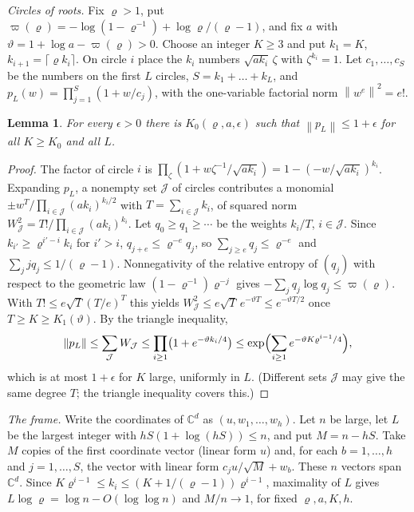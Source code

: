 \documentclass[11pt,a4paper]{article}
\newtheorem{lemma}[theorem]{Lemma}
\theoremstyle{remark}
\newcommand{\norm}[1]{\left\lVert#1\right\rVert}
\newcommand{\C}{\mathbb C}
\begin{document}
\emph{Circles of roots.} Fix $\varrho>1$, put $\varpi(\varrho)=-\log(1-\varrho^{-1})+\log\varrho/(\varrho-1)$, and fix $a$ with $\vartheta=1+\log a-\varpi(\varrho)>0$. Choose an integer $K\ge3$ and put $k_1=K$, $k_{i+1}=\lceil\varrho k_i\rceil$. On circle $i$ place the $k_i$ numbers $\sqrt{ak_i}\,\zeta$ with $\zeta^{k_i}=1$. Let $c_1,\dots,c_S$ be the numbers on the first $L$ circles, $S=k_1+\dots+k_L$, and $p_L(w)=\prod_{j=1}^S(1+w/c_j)$, with the one-variable factorial norm $\norm{w^e}^2=e!$.
\begin{lemma}\label{lem:circles}
For every $\epsilon>0$ there is $K_0(\varrho,a,\epsilon)$ such that $\norm{p_L}\le1+\epsilon$ for all $K\ge K_0$ and all $L$.
\end{lemma}
\begin{proof}
The factor of circle $i$ is $\prod_\zeta(1+w\zeta^{-1}/\sqrt{ak_i})=1-(-w/\sqrt{ak_i})^{k_i}$. Expanding $p_L$, a nonempty set $\mathcal J$ of circles contributes a monomial $\pm w^T/\prod_{i\in\mathcal J}(ak_i)^{k_i/2}$ with $T=\sum_{i\in\mathcal J}k_i$, of squared norm $W_{\mathcal J}^2=T!/\prod_{i\in\mathcal J}(ak_i)^{k_i}$. Let $q_0\ge q_1\ge\cdots$ be the weights $k_i/T$, $i\in\mathcal J$. Since $k_{i'}\ge\varrho^{i'-i}k_i$ for $i'>i$, $q_{j+e}\le\varrho^{-e}q_j$, so $\sum_{j\ge e}q_j\le\varrho^{-e}$ and $\sum_jjq_j\le1/(\varrho-1)$. Nonnegativity of the relative entropy of $(q_j)$ with respect to the geometric law $(1-\varrho^{-1})\varrho^{-j}$ gives $-\sum_jq_j\log q_j\le\varpi(\varrho)$. With $T!\le e\sqrt T(T/e)^T$ this yields $W_{\mathcal J}^2\le e\sqrt T\,e^{-\vartheta T}\le e^{-\vartheta T/2}$ once $T\ge K\ge K_1(\vartheta)$. By the triangle inequality,
\[
 \norm{p_L}\le\sum_{\mathcal J}W_{\mathcal J}\le\prod_{i\ge1}\bigl(1+e^{-\vartheta k_i/4}\bigr)\le\exp\Bigl(\sum_{i\ge1}e^{-\vartheta K\varrho^{i-1}/4}\Bigr),
\]
which is at most $1+\epsilon$ for $K$ large, uniformly in $L$. (Different sets $\mathcal J$ may give the same degree $T$; the triangle inequality covers this.)
\end{proof}

\emph{The frame.} Write the coordinates of $\C^d$ as $(u,w_1,\dots,w_h)$. Let $n$ be large, let $L$ be the largest integer with $hS(1+\log(hS))\le n$, and put $M=n-hS$. Take $M$ copies of the first coordinate vector (linear form $u$) and, for each $b=1,\dots,h$ and $j=1,\dots,S$, the vector with linear form $c_ju/\sqrt M+w_b$. These $n$ vectors span $\C^d$. Since $K\varrho^{i-1}\le k_i\le(K+1/(\varrho-1))\varrho^{i-1}$, maximality of $L$ gives $L\log\varrho=\log n-O(\log\log n)$ and $M/n\to1$, for fixed $\varrho,a,K,h$.
\end{document}

